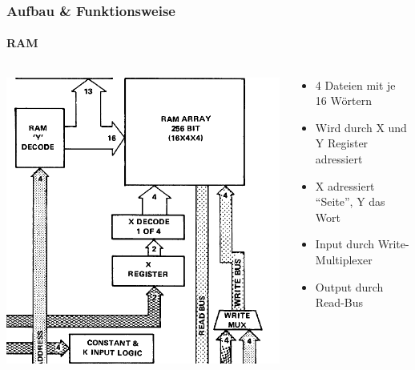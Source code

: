 \begin{frame}
\frametitle{Aufbau \& Funktionsweise}
	\framesubtitle{RAM}
		\begin{columns}
			\begin{column}{5cm}
				\includegraphics[scale=0.3]{images/RAM.PNG}
			\end{column}
			\begin{column}{5cm}
				\begin{itemize}
					\item 4 Dateien mit je 16 W{\"o}rtern \pause
					\item Wird durch X und Y Register adressiert \pause
					\item X adressiert "`Seite"', Y das Wort \pause
					\item Input durch Write-Multiplexer \pause
					\item Output durch Read-Bus
				\end{itemize}
			\end{column}
		\end{columns}
\end{frame}

